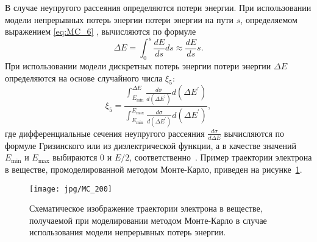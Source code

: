 В случае неупругого рассеяния определяются потери энергии. При использовании модели непрерывных потерь энергии потери энергии на пути $s$, определяемом выражением \ref{eq:MC_6} , вычисляются по формуле
\begin{equation} \label{eq:MC_15}
	\Delta E=\int_0^s \frac{d E}{d s} d s \approx \frac{d E}{d s} s.
\end{equation}
При использовании модели дискретных потерь энергии потери энергии $\Delta E$ определяются на основе случайного числа $\xi_5$:
\begin{equation} \label{eq:MC_16}
	\xi_5 = \frac
	{\displaystyle \int_{E_\mathrm{min}}^{\Delta E} \frac{d \sigma}{d\left(\Delta E^{\prime}\right)} d\left(\Delta E^{\prime}\right)}
	{\displaystyle \int_{E_\mathrm{min}}^{E_\mathrm{max}} \frac{d \sigma}{d\left(\Delta E^{\prime}\right)} d\left(\Delta E^{\prime}\right)},
\end{equation}
где дифференциальные сечения неупругого рассеяния $\displaystyle{\frac{d \sigma}{d \Delta E}}$ вычисляются по формуле Гризинского или из диэлектрической функции, а в качестве значений $E_\mathrm{min}$ и $E_\mathrm{max}$ выбираются $0$ и $E/2$, соответственно~\cite{Dapor_large_book}. Пример траектории электрона в веществе, промоделированной методом Монте-Карло, приведен на рисунке~\ref{fig:Monte_Carlo_scheme}.

\begin{figure}
	\centering
	\texttt{[image: jpg/MC\_200]}
	\vspace{0.5em}
	\caption{Схематическое изображение траектории электрона в веществе, получаемой при моделировании методом Монте-Карло в случае использования модели непрерывных потерь энергии.\vspace{1.5em}}
	\label{fig:Monte_Carlo_scheme}
\end{figure}
